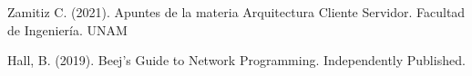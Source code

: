 \documentclass{article}
\begin{document}
\begin{thebibliography}{}

 Zamitiz C. (2021). Apuntes de la materia Arquitectura Cliente Servidor. Facultad de Ingeniería. UNAM

 Hall, B. (2019). Beej’s Guide to Network Programming. Independently Published.

\end{thebibliography} 
\end{document}
